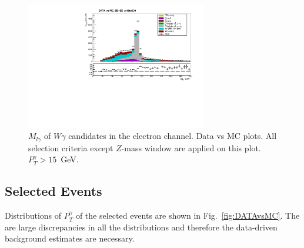 \begin{figure}[htb]
  \begin{center}
   \includegraphics[width=0.7\textwidth]{../figs/figs_v11/ELECTRON_WGamma/PrepareYields/c_TotalDATAvsMC_EtaCommon__Mpholep1PRELIMINARY_FOR_E_TO_GAMMA_WITH_PSV_CUT_pt15to500_.pdf}
  \caption{$M_{l\gamma}$ of $W\gamma$ candidates in the electron channel. Data vs MC plots. All selection criteria except $Z$-mass window are applied on this plot. $P_T^{\gamma}>15$~GeV. }
  \label{fig:DATAvsMC_Mpholep1}
  \end{center}
\end{figure}

\subsection{Selected Events}


Distributions of $P_T^{\gamma}$ of the selected events are shown in Fig.~\ref{fig:DATAvsMC}. The are large discrepancies in all the distributions and therefore the data-driven background estimates are necessary.

